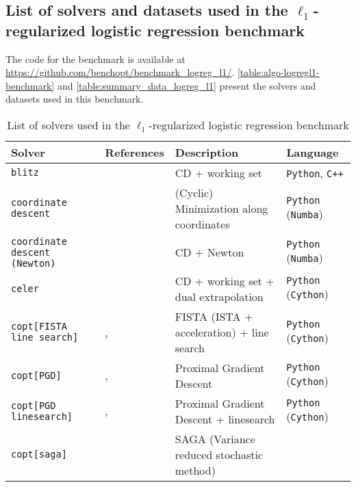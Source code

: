 \documentclass{article}
\newcommand{\repo}[1]{#1}
\begin{document}
\subsection{List of solvers and datasets used in the $\ell_1$-regularized logistic regression benchmark}


\repo{The code for the benchmark is available at \url{https://github.com/benchopt/benchmark_logreg_l1/}.}
\autoref{table:algo-logregl1-benchmark} and \autoref{table:summary_data_logreg_l1} present the solvers and datasets used in this benchmark.
\begin{table}[h]
  \centering
  \footnotesize
  \caption{List of solvers used in the $\ell_1$-regularized logistic regression benchmark}
\begin{tabular}{p{3.2cm} p{3.3cm} p{3cm} l}
  \toprule
  \textbf{Solver} & \textbf{References} &\textbf{Description} & \textbf{Language}\\
  \midrule
  \texttt{blitz} &\citet{johnson2015blitz}
                 & CD + working set
                 & \texttt{Python}, \texttt{C++}\\
  \texttt{coordinate descent} &\citet{Friedman_10}
                              & (Cyclic) Minimization along coordinates
                              & \texttt{Python} (\texttt{Numba})\\
  \texttt{coordinate descent (Newton)} &\citet{Friedman_10}
                              & CD + Newton
                              & \texttt{Python} (\texttt{Numba})\\
  \texttt{celer} &\citet{Massias_Gramfort_Salmon2018}
                 & CD + working set + dual extrapolation
                 & \texttt{Python} (\texttt{Cython})\\
  \texttt{copt[FISTA line search]} & \citet{Pedregosa_20}, \citet{Beck_Teboulle09}
                          & FISTA (ISTA + acceleration) + line search
                          &\texttt{Python} (\texttt{Cython})\\
  \texttt{copt[PGD]} & \citet{Pedregosa_20}, \citet{Combettes2005}
                          & Proximal Gradient Descent
                          &\texttt{Python} (\texttt{Cython})\\
  \texttt{copt[PGD linesearch]} & \citet{Pedregosa_20}, \citet{ Combettes2005}
                          & Proximal Gradient Descent + linesearch
                          &\texttt{Python} (\texttt{Cython})\\
  \texttt{copt[saga]} & \citet{Pedregosa_20}
                          & SAGA (Variance reduced stochastic method)

\end{tabular}
\end{table}
\end{document}
